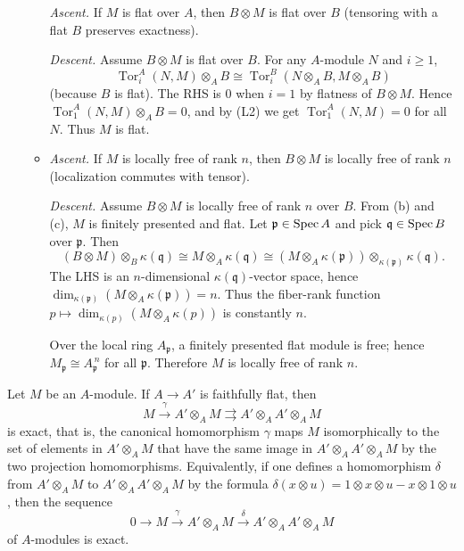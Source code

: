 \documentclass[12pt]{article}
\begin{document}
\begin{enumerate}
\begin{itemize}
\textit{Ascent.} If $M$ is flat over $A$, then $B\otimes M$ is flat over $B$ (tensoring with a flat $B$ preserves exactness). 

\textit{Descent.} Assume $B\otimes M$ is flat over $B$. For any $A$-module $N$ and $i\geq 1$,
\[
\operatorname{Tor}_i^A(N,M)\otimes_A B \cong \operatorname{Tor}_i^B(N\otimes_A B, M\otimes_A B)
\]
(because $B$ is flat). The RHS is $0$ when $i=1$ by flatness of $B\otimes M$. Hence $\operatorname{Tor}_1^A(N,M)\otimes_A B=0$, and by (L2) we get $\operatorname{Tor}_1^A(N,M)=0$ for all $N$. Thus $M$ is flat.

\item {}

\textit{Ascent.} If $M$ is locally free of rank $n$, then $B\otimes M$ is locally free of rank $n$ (localization commutes with tensor). 

\textit{Descent.} Assume $B\otimes M$ is locally free of rank $n$ over $B$. From (b) and (c), $M$ is finitely presented and flat. Let $\mathfrak{p}\in\operatorname{Spec} A$ and pick $\mathfrak{q}\in\operatorname{Spec} B$ over $\mathfrak{p}$. Then
\[
(B\otimes M)\otimes_B \kappa(\mathfrak{q}) \cong M\otimes_A \kappa(\mathfrak{q}) \cong (M\otimes_A \kappa(\mathfrak{p}))\otimes_{\kappa(\mathfrak{p})} \kappa(\mathfrak{q}).
\]
The LHS is an $n$-dimensional $\kappa(\mathfrak{q})$-vector space, hence $\dim_{\kappa(\mathfrak{p})}(M\otimes_A \kappa(\mathfrak{p}))=n$. Thus the fiber-rank function $p\mapsto \dim_{\kappa(p)}(M\otimes_A \kappa(p))$ is constantly $n$.

Over the local ring $A_{\mathfrak{p}}$, a finitely presented flat module is free; hence $M_{\mathfrak{p}}\cong A_{\mathfrak{p}}^{\,n}$ for all $\mathfrak{p}$. Therefore $M$ is locally free of rank $n$.

    \end{itemize}
\end{enumerate}

\begin{lemma}\label{lem:descent}
    Let $M$ be an $A$-module. If $A \to A'$ is faithfully flat, then
    \[
        M \xrightarrow{\gamma} A' \otimes_A M \rightrightarrows A' \otimes_A A' \otimes_A M
    \]
    is exact, that is, the canonical homomorphism $\gamma$ maps $M$ isomorphically to the set of elements in $A' \otimes_A M$ that have the same image in $A' \otimes_A A' \otimes_A M$ by the two projection homomorphisms. Equivalently, if one defines a homomorphism $\delta$ from $A' \otimes_A M$ to $A' \otimes_A A' \otimes_A M$ by the formula $\delta(x \otimes u) = 1 \otimes x \otimes u - x \otimes 1 \otimes u$, then the sequence
    \[
        0 \to M \xrightarrow{\gamma} A' \otimes_A M \xrightarrow{\delta} A' \otimes_A A' \otimes_A M
    \]
    of $A$-modules is exact.
\end{lemma}
\end{document}

